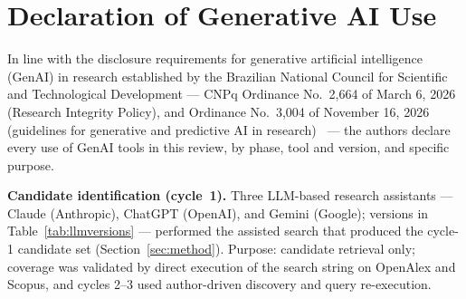 \documentclass{ieeeaccess}
\begin{document}

\section*{Declaration of Generative AI Use}

In line with the disclosure requirements for generative artificial
intelligence (GenAI) in research established by the Brazilian National
Council for Scientific and Technological Development --- CNPq Ordinance
No.~2{,}664 of March 6, 2026 (Research Integrity Policy), and Ordinance
No.~3{,}004 of November 16, 2026 (guidelines for generative and
predictive AI in research)~\cite{cnpq2664,cnpq3004} --- the authors
declare every use of GenAI tools in this review, by phase, tool and
version, and specific purpose.

\textbf{Candidate identification (cycle~1).} Three LLM-based research
assistants --- Claude (Anthropic), ChatGPT (OpenAI), and Gemini
(Google); versions in Table~\ref{tab:llmversions} --- performed the
assisted search that produced the cycle-1 candidate set
(Section~\ref{sec:method}). Purpose: candidate retrieval only; coverage
was validated by direct execution of the search string on OpenAlex and
Scopus, and cycles 2--3 used author-driven discovery and query
re-execution.
\end{document}
